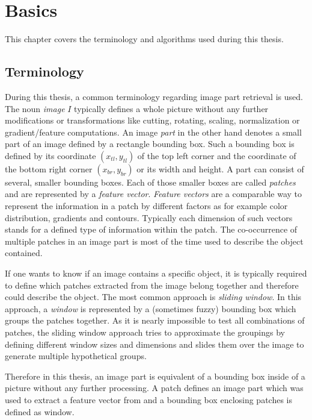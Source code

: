 \chapter{Basics}

This chapter covers the terminology and algorithms used during this thesis. 

\section{Terminology}

During this thesis, a common terminology regarding image part retrieval is used. The noun \textit{image} $I$ typically defines a whole picture without any further modifications or transformations like cutting, rotating, scaling, normalization or gradient/feature computations. An image \textit{part} in the other hand denotes a small part of an image defined by a rectangle bounding box. Such a bounding box is defined by its coordinate $(x_{tl},y_{tl})$ of the top left corner and the coordinate of the bottom right corner $(x_{br},y_{br})$ or its width and height. A part can consist of several, smaller bounding boxes. Each of those smaller boxes are called \textit{patches} and are represented by a \textit{feature vector}. \textit{Feature vectors} are a comparable way to represent the information in a patch by different factors as for example color distribution, gradients and contours. Typically each dimension of such vectors stands for a defined type of information within the patch. The co-occurrence of multiple patches in an image part is most of the time used to describe the object contained.

If one wants to know if an image contains a specific object, it is typically required to define which patches extracted from the image belong together and therefore could describe the object. The most common approach is \textit{sliding window}. In this approach, a \textit{window} is represented by a (sometimes fuzzy) bounding box which groups the patches together. As it is nearly impossible to test all combinations of patches, the sliding window approach tries to approximate the groupings by defining different window sizes and dimensions and slides them over the image to generate multiple hypothetical groups.

Therefore in this thesis, an image part is equivalent of a bounding box inside of a picture without any further processing. A patch defines an image part which was used to extract a feature vector from and a bounding box enclosing patches is defined as window.
\bigskip

